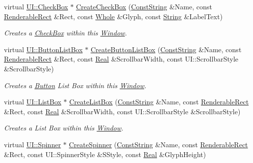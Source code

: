 \begin{DoxyCompactItemize}
virtual \hyperlink{classphys_1_1UI_1_1CheckBox}{UI::CheckBox} $\ast$ \hyperlink{classphys_1_1UI_1_1Window_aa1bab1d930293e01ca8af34dc6e3d2e4}{CreateCheckBox} (\hyperlink{namespacephys_a5ce5049f8b4bf88d6413c47b504ebb31}{ConstString} \&Name, const \hyperlink{structphys_1_1UI_1_1RenderableRect}{RenderableRect} \&Rect, const \hyperlink{namespacephys_a460f6bc24c8dd347b05e0366ae34f34a}{Whole} \&Glyph, const \hyperlink{namespacephys_aa03900411993de7fbfec4789bc1d392e}{String} \&LabelText)
\begin{DoxyCompactList}\small\item\em Creates a \hyperlink{classphys_1_1UI_1_1CheckBox}{CheckBox} within this \hyperlink{classphys_1_1UI_1_1Window}{Window}. \item\end{DoxyCompactList}\item 
virtual \hyperlink{classphys_1_1UI_1_1ButtonListBox}{UI::ButtonListBox} $\ast$ \hyperlink{classphys_1_1UI_1_1Window_addeb37ade50e251e9209afdaab952bc7}{CreateButtonListBox} (\hyperlink{namespacephys_a5ce5049f8b4bf88d6413c47b504ebb31}{ConstString} \&Name, const \hyperlink{structphys_1_1UI_1_1RenderableRect}{RenderableRect} \&Rect, const \hyperlink{namespacephys_af7eb897198d265b8e868f45240230d5f}{Real} \&ScrollbarWidth, const UI::ScrollbarStyle \&ScrollbarStyle)
\begin{DoxyCompactList}\small\item\em Creates a \hyperlink{classphys_1_1UI_1_1Button}{Button} List Box within this \hyperlink{classphys_1_1UI_1_1Window}{Window}. \item\end{DoxyCompactList}\item 
virtual \hyperlink{classphys_1_1UI_1_1ListBox}{UI::ListBox} $\ast$ \hyperlink{classphys_1_1UI_1_1Window_a417bb319e32e627bd2aa7680c8f2d868}{CreateListBox} (\hyperlink{namespacephys_a5ce5049f8b4bf88d6413c47b504ebb31}{ConstString} \&Name, const \hyperlink{structphys_1_1UI_1_1RenderableRect}{RenderableRect} \&Rect, const \hyperlink{namespacephys_af7eb897198d265b8e868f45240230d5f}{Real} \&ScrollbarWidth, const UI::ScrollbarStyle \&ScrollbarStyle)
\begin{DoxyCompactList}\small\item\em Creates a List Box within this \hyperlink{classphys_1_1UI_1_1Window}{Window}. \item\end{DoxyCompactList}\item 
virtual \hyperlink{classphys_1_1UI_1_1Spinner}{UI::Spinner} $\ast$ \hyperlink{classphys_1_1UI_1_1Window_a9f08d5531890927980483448226d7656}{CreateSpinner} (\hyperlink{namespacephys_a5ce5049f8b4bf88d6413c47b504ebb31}{ConstString} \&Name, const \hyperlink{structphys_1_1UI_1_1RenderableRect}{RenderableRect} \&Rect, const UI::SpinnerStyle \&SStyle, const \hyperlink{namespacephys_af7eb897198d265b8e868f45240230d5f}{Real} \&GlyphHeight)

\end{DoxyCompactItemize}
